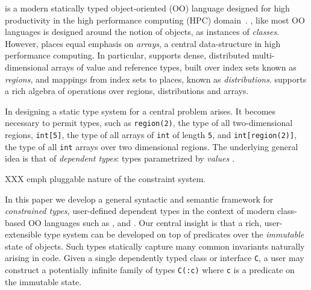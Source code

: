 
%

%
%
%

\Xten{} is a modern statically typed object-oriented (OO) language
designed for high productivity in the high performance computing (HPC)
domain~\cite{X10}. \Xten{}, like most OO languages is designed around the notion
of objects, as instances of {\em classes}. However, \Xten{} places
equal emphasis on {\em arrays}, a central data-structure in high
performance computing. In particular, \Xten{} supports dense,
distributed multi-dimensional arrays of value and reference types,
built over index sets known as {\em regions}, and mappings from index
sets to places, known as {\em distributions}.  \Xten{} supports a rich
algebra of operations over regions, distributions and arrays.

In designing a static type system for \Xten{} a central problem
arises. It becomes necessary to permit types, such as {\tt region(2)},
the type of all two-dimensional regions, {\tt int[5]}, the type of
all arrays of {\tt int} of length {\tt 5}, and {\tt int[region(2)]},
the type of all {\tt int} arrays over two dimensional regions.
The underlying
general idea is that of {\em dependent types}: types
parametrized by {\em values} \cite{xi99dependent}.

XXX emph pluggable nature of the constraint system.


In this paper we develop a general syntactic and semantic framework
for {\em constrained types}, user-defined dependent types
in the context of modern class-based
OO languages such as \java{}, \csharp{} and \Xten{}. Our central
insight is that a rich, user-extensible type system can be developed
on top of predicates over the {\em immutable} state of objects. Such
types statically capture many common invariants naturally arising in
code. Given a single dependently typed class or interface {\tt C}, a
user may construct a potentially infinite family of types {\tt C(:c)}
where {\tt c} is a predicate on the immutable state.

